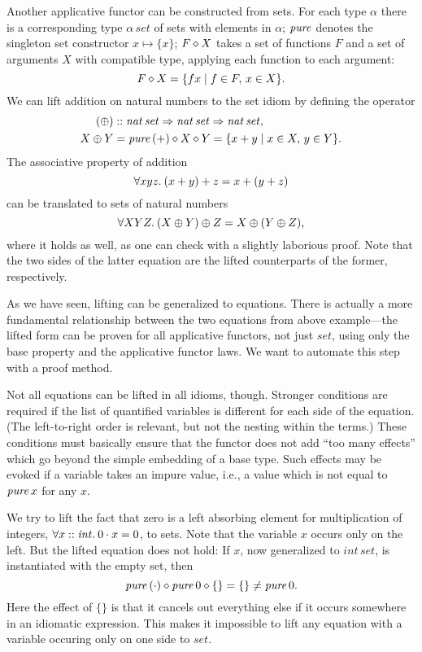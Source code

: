\begin{example}\label{exmp:set-intro}
Another applicative functor can be constructed from sets.
For each type $\alpha$ there is a corresponding type $\alpha\,\mathit{set}$
of sets with elements in $\alpha$;
$\operatorname{\mathit{pure}}$ denotes the singleton set constructor $x \mapsto \{x\}$;
$F \diamond X$ takes a set of functions $F$ and a set of arguments $X$
with compatible type, applying each function to each argument:
\[ F \diamond X = \{f x\mid f \in F,\, x \in X\}. \]
We can lift addition on natural numbers to the set idiom by defining the operator
\begin{align*}
	(\oplus) &\mathrel{::} \mathit{nat}\,\mathit{set} \Rightarrow \mathit{nat}\,\mathit{set} \Rightarrow
		\mathit{nat}\,\mathit{set}, \\
	X \oplus Y &= \operatorname{\mathit{pure}}{(+)} \diamond X \diamond Y = \{x + y\mid x \in X,\, y \in Y\}.
\end{align*}
The associative property of addition
\[ \forall x y z.\>(x + y) + z = x + (y + z) \]
can be translated to sets of natural numbers
\[ \forall X Y Z.\>(X \oplus Y) \oplus Z = X \oplus (Y \oplus Z), \]
where it holds as well, as one can check with a slightly laborious proof.
Note that the two sides of the latter equation are the lifted counterparts
of the former, respectively.
\end{example}

As we have seen, lifting can be generalized to equations.
There is actually a more fundamental relationship between the two equations
from above example---the lifted form can be proven for all applicative
functors, not just $\mathit{set}$, using only the base property and the
applicative functor laws.
We want to automate this step with a proof method.

Not all equations can be lifted in all idioms, though.
Stronger conditions are required if the list of quantified variables is
different for each side of the equation.
(The left-to-right order is relevant, but not the nesting within the terms.)
These conditions must basically ensure that the functor does not add ``too many
effects'' which go beyond the simple embedding of a base type.
Such effects may be evoked if a variable takes an impure value, i.e., a value
which is not equal to $\operatorname{\mathit{pure}} x$ for any $x$.

\begin{example}\label{exmp:set-counterexmp}
We try to lift the fact that zero is a left absorbing element for
multiplication of integers, $\forall x \mathrel{::} \mathit{int}.\>0 \cdot x = 0$,
to sets.
Note that the variable $x$ occurs only on the left.
But the lifted equation does not hold: If $x$, now generalized to
$\mathit{int}\,\mathit{set}$, is instantiated with the empty set, then
\[ \operatorname{\mathit{pure}}{(\cdot)} \diamond \operatorname{\mathit{pure}} 0 \diamond \{\} = \{\} \ne \operatorname{\mathit{pure}} 0. \]
Here the effect of $\{\}$ is that it cancels out everything else if it occurs
somewhere in an idiomatic expression.
This makes it impossible to lift any equation with a variable occuring only on
one side to $\mathit{set}$.
\end{example}
